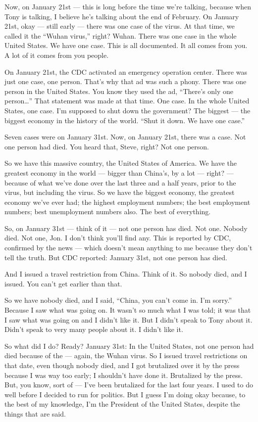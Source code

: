 Now, on January 21st --- this is long before the time we're talking,
because when Tony is talking, I believe he's talking about the end of
February. On January 21st, okay --- still early --- there was one case
of the virus. At that time, we called it the ``Wuhan virus,'' right?
Wuhan. There was one case in the whole United States. We have one case.
This is all documented. It all comes from you. A lot of it comes from
you people.

On January 21st, the CDC activated an emergency operation center. There
was just one case, one person. That's why that ad was such a phony.
There was one person in the United States. You know they used the ad,
``There's only one person\ldots{}'' That statement was made at that
time. One case. In the whole United States, one case. I'm supposed to
shut down the government? The biggest --- the biggest economy in the
history of the world. ``Shut it down. We have one case.''

Seven cases were on January 31st. Now, on January 21st, there was a
case. Not one person had died. You heard that, Steve, right? Not one
person.

So we have this massive country, the United States of America. We have
the greatest economy in the world --- bigger than China's, by a lot ---
right? --- because of what we've done over the last three and a half
years, prior to the virus, but including the virus. So we have the
biggest economy, the greatest economy we've ever had; the highest
employment numbers; the best employment numbers; best unemployment
numbers also. The best of everything.

So, on January 31st --- think of it --- not one person has died. Not
one. Nobody died. Not one, Jon. I don't think you'll find any. This is
reported by CDC, confirmed by the news --- which doesn't mean anything
to me because they don't tell the truth. But CDC reported: January 31st,
not one person has died.

And I issued a travel restriction from China. Think of it. So nobody
died, and I issued. You can't get earlier than that.

So we have nobody died, and I said, ``China, you can't come in. I'm
sorry.'' Because I saw what was going on. It wasn't so much what I was
told; it was that I saw what was going on and I didn't like it. But I
didn't speak to Tony about it. Didn't speak to very many people about
it. I didn't like it.

So what did I do? Ready? January 31st: In the United States, not one
person had died because of the --- again, the Wuhan virus. So I issued
travel restrictions on that date, even though nobody died, and I got
brutalized over it by the press because I was way too early; I shouldn't
have done it. Brutalized by the press. But, you know, sort of --- I've
been brutalized for the last four years. I used to do well before I
decided to run for politics. But I guess I'm doing okay because, to the
best of my knowledge, I'm the President of the United States, despite
the things that are said.


